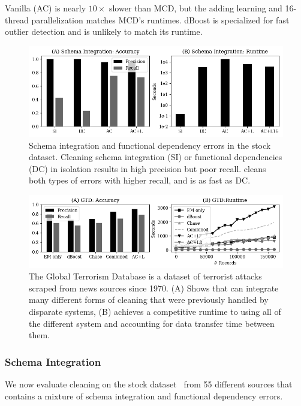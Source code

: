 Vanilla \sys (AC) is nearly $10\times$ slower than MCD, but the adding learning and 16-thread parallelization  matches MCD's runtimes.  dBoost is specialized for fast outlier detection and \sys is unlikely to match its runtime.  


\begin{figure}
    \centering
    \includegraphics[width=\columnwidth]{exp/exp3.png}
    \caption{\small Schema integration and functional dependency errors in the stock dataset.  Cleaning schema integration (SI) or functional dependencies (DC) in isolation results in high precision but poor recall.  \sys cleans both types of errors with higher recall, and is as fast as DC.  \label{exp3a}}
\end{figure}

\begin{figure}[ht]
    \centering
    \includegraphics[width=\columnwidth]{exp/exp7.png}
    \caption{The Global Terrorism Database is a dataset of terrorist attacks scraped from news sources since 1970. (A) Shows that \sys can integrate many different forms of cleaning that were previously handled by disparate systems, (B) \sys achieves a competitive runtime to using all of the different system and accounting for data transfer time between them. \label{exp7a}}
\end{figure}

\subsubsection{Schema Integration}
We now evaluate cleaning on the stock dataset~\cite{data-flights} from 55 different sources that contains a mixture of schema integration and functional dependency errors.

